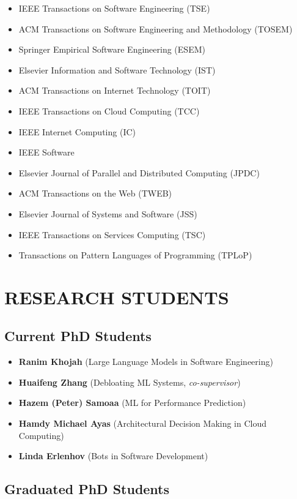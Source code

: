 \documentclass[paper=letter,fontsize=11pt]{scrartcl} %
\newcommand{\NewPart}[2]{\section*{\uppercase{#1} #2}}
\begin{document}
\begin{itemize}
\item IEEE Transactions on Software Engineering (TSE)
\item ACM  Transactions on Software Engineering and Methodology (TOSEM)
\item Springer Empirical Software Engineering (ESEM)
\item Elsevier Information and Software Technology (IST)
\item ACM Transactions on Internet Technology (TOIT)
\item IEEE Transactions on Cloud Computing (TCC)
\item IEEE Internet Computing (IC)
\item IEEE Software
\item Elsevier Journal of Parallel and Distributed Computing (JPDC)
\item ACM Transactions on the Web (TWEB)
\item Elsevier Journal of Systems and Software (JSS)
\item IEEE Transactions on Services Computing (TSC)
\item Transactions on Pattern Languages of Programming (TPLoP)
\end{itemize}

\NewPart{Research Students}{}

\subsection*{Current PhD Students}

\begin{itemize}
\item \textbf{Ranim Khojah} (Large Language Models in Software Engineering)
\item \textbf{Huaifeng Zhang}  (Debloating ML Systems, \emph{co-supervisor})  
\item \textbf{Hazem (Peter) Samoaa}  (ML for Performance Prediction)
\item \textbf{Hamdy Michael Ayas}  (Architectural Decision Making in Cloud Computing)
\item \textbf{Linda Erlenhov}  (Bots in Software Development)
\end{itemize}

\subsection*{Graduated PhD Students}
\end{document}
